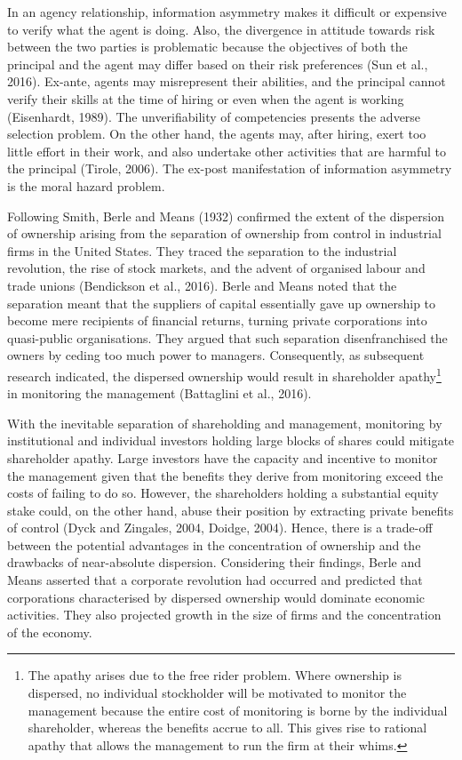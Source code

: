 \documentclass[a4paper, nobind]{templates/ociamthesis}
\begin{document}
In an agency relationship, information asymmetry makes it difficult or expensive to verify what the agent is doing. Also, the divergence in attitude towards risk between the two parties is problematic because the objectives of both the principal and the agent may differ based on their risk preferences (Sun et al., 2016). Ex-ante, agents may misrepresent their abilities, and the principal cannot verify their skills at the time of hiring or even when the agent is working (Eisenhardt, 1989). The unverifiability of competencies presents the adverse selection problem. On the other hand, the agents may, after hiring, exert too little effort in their work, and also undertake other activities that are harmful to the principal (Tirole, 2006). The ex-post manifestation of information asymmetry is the moral hazard problem.

Following Smith, Berle and Means (1932) confirmed the extent of the dispersion of ownership arising from the separation of ownership from control in industrial firms in the United States. They traced the separation to the industrial revolution, the rise of stock markets, and the advent of organised labour and trade unions (Bendickson et al., 2016). Berle and Means noted that the separation meant that the suppliers of capital essentially gave up ownership to become mere recipients of financial returns, turning private corporations into quasi-public organisations. They argued that such separation disenfranchised the owners by ceding too much power to managers. Consequently, as subsequent research indicated, the dispersed ownership would result in shareholder apathy\footnote{The apathy arises due to the free rider problem. Where ownership is dispersed, no individual stockholder will be motivated to monitor the management because the entire cost of monitoring is borne by the individual shareholder, whereas the benefits accrue to all. This gives rise to rational apathy that allows the management to run the firm at their whims.} in monitoring the management (Battaglini et al., 2016).

With the inevitable separation of shareholding and management, monitoring by institutional and individual investors holding large blocks of shares could mitigate shareholder apathy. Large investors have the capacity and incentive to monitor the management given that the benefits they derive from monitoring exceed the costs of failing to do so. However, the shareholders holding a substantial equity stake could, on the other hand, abuse their position by extracting private benefits of control (Dyck and Zingales, 2004, Doidge, 2004). Hence, there is a trade-off between the potential advantages in the concentration of ownership and the drawbacks of near-absolute dispersion. Considering their findings, Berle and Means asserted that a corporate revolution had occurred and predicted that corporations characterised by dispersed ownership would dominate economic activities. They also projected growth in the size of firms and the concentration of the economy.
\end{document}
